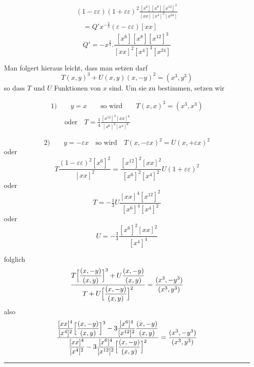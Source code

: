 \[
\begin{gathered}(1-\varepsilon\varepsilon)(1+\varepsilon\varepsilon)^2
\frac{[x^6][x^8][x^{12}]^3}{[xx][x^4]^3[x^{24}]}
\\[8pt]\quad{}=Q'x^{-\frac23}(\varepsilon-\varepsilon\varepsilon)[xx]\end{gathered}
\]
\[
Q'=-x^{\frac23}.\frac{[x^6][x^8][x^{12}]^3}{[xx]^2[x^4]^3[x^{24}]}
\]


Man folgert hieraus leicht, dass man setzen darf
\[
T(x,y)^3+U(x,y)(x,-y)^2=(x^3,y^3)
\]
so dass $T$ und $U$ Funktionen von $x$ sind. Um sie zu bestimmen, setzen wir



\[
\begin{gathered}1)\qquad y=x\qquad\text{so wird}\qquad
T(x,x)^3=(x^3,x^3)\\[8pt]\quad{}\quad\text{oder}\quad
T=\tfrac14\frac{[x^{12}]^2[xx]^6}{[x^6]^2[x^4]^6}\end{gathered}
\]

\[
2)\qquad y=-\varepsilon x\quad\text{so wird}\quad
T(x,-\varepsilon x)^2=U(x,+\varepsilon x)^2
\]
oder
\[
T\frac{(1-\varepsilon\varepsilon)^2[x^6]^2}{[xx]^2}
=\frac{[x^{12}]^2[xx]^2}{[x^6]^2[x^4]^2}U(1+\varepsilon\varepsilon)^2
\]
oder
\[
T=-\tfrac13 U\frac{[xx]^4[x^{12}]^2}{[x^6]^4[x^4]^2}
\]
oder
\[
U=-\tfrac34\frac{[x^6]^2[xx]^2}{[x^4]^4}
\]

folglich
\[
\begin{gathered}\frac{T\Bigl[\dfrac{(x,-y)}{(x,y)}\Bigr]^3
+U\dfrac{(x,-y)}{(x,y)}}
{T+U\Bigl[\dfrac{(x,-y)}{(x,y)}\Bigr]^2}
=\frac{(x^3,-y^3)}{(x^3,y^3)}\end{gathered}
\]
also
\[
\begin{gathered}\frac{\dfrac{[xx]^4}{[x^4]^2}
\Bigl[\dfrac{(x,-y)}{(x,y)}\Bigr]^3
-3\dfrac{[x^6]^4}{[x^{12}]^2}\dfrac{(x,-y)}{(x,y)}}
{\dfrac{[xx]^4}{[x^4]^2}
-3\dfrac{[x^6]^4}{[x^{12}]^2}
\Bigl[\dfrac{(x,-y)}{(x,y)}\Bigr]^2}
=\frac{(x^3,-y^3)}{(x^3,y^3)}\end{gathered}
\]
\begin{center}\rule{.23\textwidth}{.3pt}\end{center}

\clearpage
\endgroup
